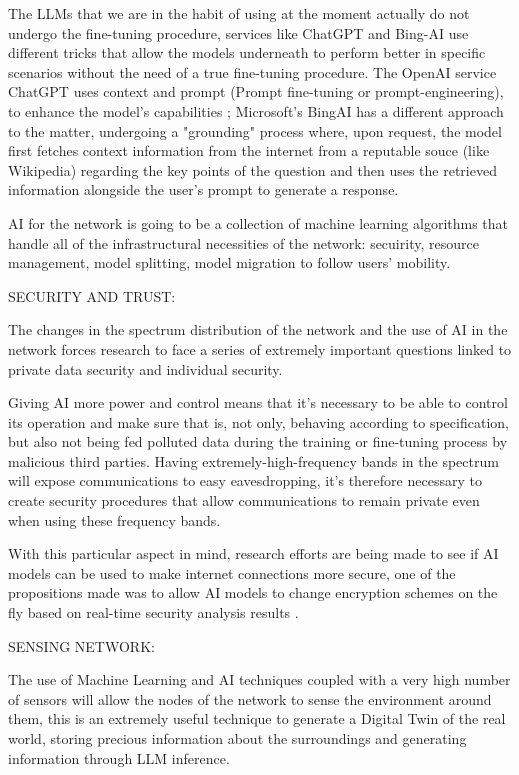 The LLMs that we are in the habit of using at the moment actually do not undergo the fine-tuning
procedure, services like ChatGPT and Bing-AI use different tricks that allow the models underneath
to perform better in specific scenarios without the need of a true fine-tuning procedure.
The OpenAI service ChatGPT uses context and prompt (Prompt fine-tuning or prompt-engineering), to
enhance the model's capabilities \cite{openAI}; Microsoft's BingAI has a different approach to the
matter, undergoing a "grounding" process where, upon request, the model first fetches context
information from the internet from a reputable souce (like Wikipedia) regarding the key points of
the question and then uses the retrieved information alongside the user's prompt to generate a response\cite{zerotohero}.

AI for the network is going to be a collection of machine learning algorithms that handle all of the
infrastructural necessities of the network: secuirity, resource management, model splitting, model
migration to follow users' mobility.

\bigskip
\noindent
SECURITY AND TRUST:
\label{ssec:security-trust}

The changes in the spectrum distribution of the network and the use of AI in the network forces
research to face a series of extremely important questions linked to private data security and
individual security.

Giving AI more power and control means that it's necessary to be able to
control its operation and make sure that is, not only, behaving according to specification, but also
not being fed polluted data during the training or fine-tuning process by malicious third parties. Having
extremely-high-frequency bands in the spectrum will expose communications to easy
eavesdropping, it's therefore necessary to create security procedures that allow communications to
remain private even when using these frequency bands.

With this particular aspect in mind, research
efforts are being made to see if AI models can be used to make internet connections more secure,
one of the propositions made was to allow AI models to change encryption schemes on the fly based on
real-time security analysis results \cite{6ainets}.

\bigskip
\noindent
SENSING NETWORK:
\label{ssec:sensing-network}

The use of Machine Learning and AI techniques coupled with a very high number of sensors will allow
the nodes of the network to sense the environment around them, this is an extremely useful technique
to generate a Digital Twin of the real world, storing precious information about the surroundings
and generating information through LLM inference.


